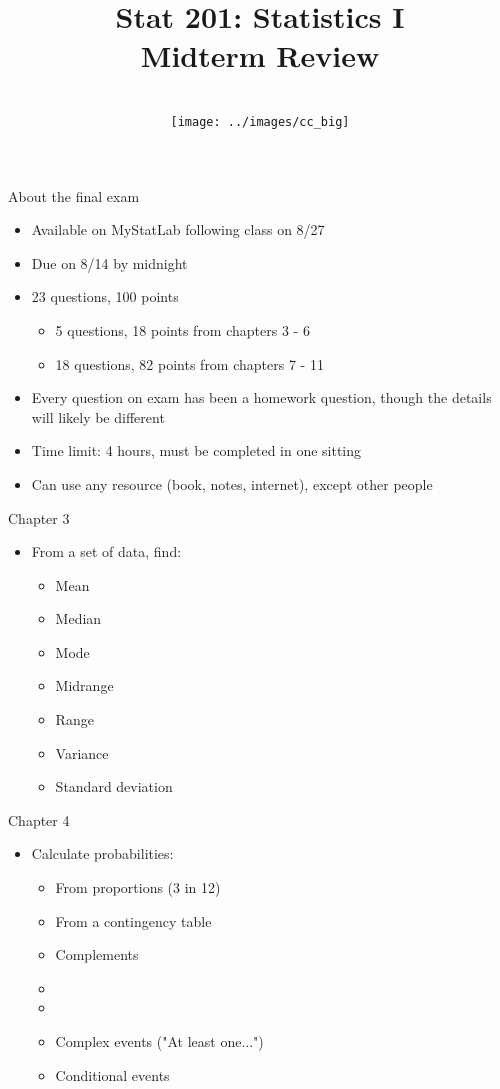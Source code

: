 \documentclass[xcolor=table]{beamer}
\title[Midterm Review]{Stat 201: Statistics I\\Midterm Review}
\author[M. Shyne]{}
\institute[Metro State]{\texttt{[image: ../images/metro\_logo]}}
\date[8/7/2018]{
\\ \bigskip \bigskip \texttt{[image: ../images/cc\_big]}}
\begin{document}
\frame{\titlepage}

\begin{frame}{About the final exam}
\begin{block}{}
\large
\begin{itemize}
\item Available on MyStatLab following class on 8/27
\item Due on 8/14 by midnight
\item 23 questions, 100 points
\begin{itemize}
\item 5 questions, 18 points from chapters 3 - 6
\item 18 questions, 82 points from chapters 7 - 11
\end{itemize}
\item Every question on exam has been a homework question, though the details will likely be different
\item Time limit: 4 hours, must be completed in one sitting
\item Can use any resource (book, notes, internet), except other people
\end{itemize}
\end{block}
\end{frame}


\begin{frame}{Chapter 3}
\begin{block}{}
\large
\begin{itemize}
\item From a set of data, find:
\begin{itemize}
\item Mean
\item Median
\item Mode
\item Midrange
\item Range
\item Variance
\item Standard deviation
\end{itemize}
\end{itemize}
\end{block}
\end{frame}

\begin{frame}{Chapter 4}
\begin{block}{}
\large
\begin{itemize}
\item Calculate probabilities:
\begin{itemize}
\item From proportions (3 in 12)
\item From a contingency table
\item Complements
\item {}
\item {}
\item Complex events ("At least one...")
\item Conditional events
\end{itemize}
\end{itemize}
\end{block}
\end{frame}
\end{document}
